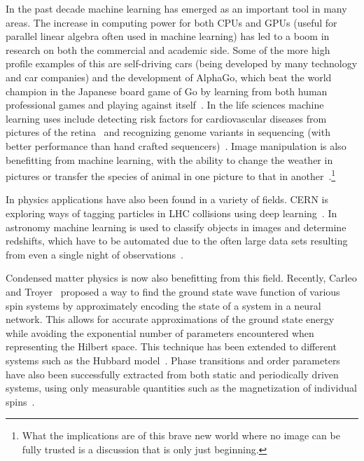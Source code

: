 \documentclass[11pt, a4paper]{report} %
\begin{document}
In the past decade machine learning has emerged as an important tool in many areas.
The increase in computing power for both CPUs and GPUs (useful for parallel linear algebra often used in machine learning) has led to a boom in research on both the commercial and academic side.
Some of the more high profile examples of this are self-driving cars (being developed by many technology and car companies) and the development of AlphaGo, which beat the world champion in the Japanese board game of Go by learning from both human professional games and playing against itself~\cite{Silver2017a,Silver2017,silver16_master_game_go_with_deep}.
In the life sciences machine learning uses include detecting risk factors for cardiovascular diseases from pictures of the retina~\cite{poplin17_predic_cardiov_risk_factor_from} and recognizing genome variants in sequencing (with better performance than hand crafted sequencers)~\cite{Poplin2016}.
Image manipulation is also benefitting from machine learning, with the ability to change the weather in pictures or transfer the species of animal in one picture to that in another~\cite{Liu2017}.\footnote{What the implications are of this brave new world where no image can be fully trusted is a discussion that is only just beginning.}

In physics applications have also been found in a variety of fields.
CERN is exploring ways of tagging particles in LHC collisions using deep learning~\cite{paganini17_machin_learn_algor_jet_taggin}.
In astronomy machine learning is used to classify objects in images and determine redshifts, which have to be automated due to the often large data sets resulting from even a single night of observations~\cite{ball10_data_minin_and_machin_learn_in_astron}.

Condensed matter physics is now also benefitting from this field.
Recently, Carleo and Troyer~\cite{Carleo2017} proposed a way to find the ground state wave function of various spin systems by approximately encoding the state of a system in a neural network. This allows for accurate approximations of the ground state energy while avoiding the exponential number of parameters encountered when representing the Hilbert space.
This technique has been extended to different systems such as the Hubbard model~\cite{Saito2017}.
Phase transitions and order parameters have also been successfully extracted from both static and periodically driven systems, using only measurable quantities such as the magnetization of individual spins~\cite{Nieuwenburg2017}.
\end{document}
